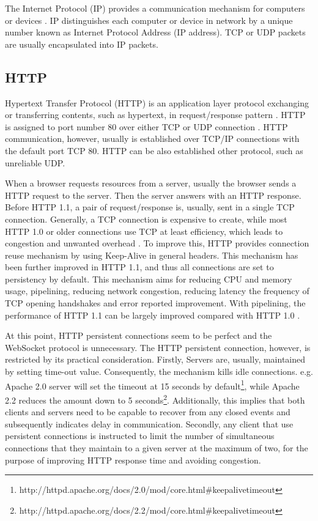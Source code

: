 The Internet Protocol (IP) provides a communication mechanism for computers or devices \cite{postel1981internet}. IP distinguishes each computer or device in network by a unique number known as Internet Protocol Address (IP address). TCP or UDP packets are usually encapsulated into IP packets.

\subsection{HTTP}

Hypertext Transfer Protocol (HTTP) is an application layer protocol exchanging or transferring contents, such as hypertext, in request/response pattern \cite{fielding1999hypertext}. HTTP is assigned to port number 80 over either TCP or UDP connection \cite{reynolds1994assigned}. HTTP communication, however, usually is established over TCP/IP connections with the default port TCP 80. HTTP can be also established other protocol, such as unreliable UDP.

When a browser requests resources from a server, usually the browser sends a HTTP request to the server. Then the server answers with an HTTP response. Before HTTP 1.1, a pair of request/response is, usually, sent in a single TCP connection. Generally, a TCP connection is expensive to create, while most HTTP 1.0 or older connections use TCP at least efficiency, which leads to congestion and unwanted overhead \cite{spero1994analysis}.  To improve this, HTTP provides connection reuse mechanism \cite{fieldingrfc} by using Keep-Alive in general headers. This mechanism has been further improved in HTTP 1.1, and thus all connections are set to persistency by default. This mechanism aims for reducing CPU and memory usage, pipelining, reducing network congestion, reducing latency the frequency of TCP opening handshakes and error reported improvement. With pipelining, the performance of HTTP 1.1 can be largely improved compared with HTTP 1.0 \cite{nielsen1997network}. 

At this point, HTTP persistent connections seem to be perfect and the WebSocket protocol is unnecessary. The HTTP persistent connection, however, is restricted by its practical consideration. Firstly, Servers are, usually, maintained by setting time-out value. Consequently, the mechanism kills idle connections. e.g. Apache 2.0 server will set the timeout at 15 seconds by default\footnote{http://httpd.apache.org/docs/2.0/mod/core.html\#keepalivetimeout}, while Apache 2.2 reduces the amount down to 5 seconds\footnote{http://httpd.apache.org/docs/2.2/mod/core.html\#keepalivetimeout}. Additionally, this implies that both clients and servers need to be capable to recover from any closed events and subsequently indicates delay in communication. Secondly, any client that use persistent connections is instructed to limit the number of simultaneous connections that they maintain to a given server at the maximum of two, for the purpose of improving HTTP response time and avoiding congestion. 

